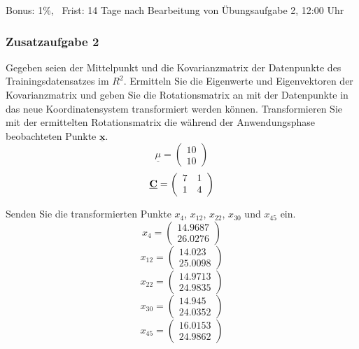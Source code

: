 \documentclass[11pt]{article}
\begin{document}
    Bonus: 1\%,\(\;\;\;\)Frist: 14 Tage nach Bearbeitung von Übungsaufgabe
2, 12:00 Uhr

\subsubsection{Zusatzaufgabe 2}\label{zusatzaufgabe-2}

Gegeben seien der Mittelpunkt und die Kovarianzmatrix der Datenpunkte
des Trainingsdatensatzes im \(R^2\). Ermitteln Sie die Eigenwerte und
Eigenvektoren der Kovarianzmatrix und geben Sie die Rotationsmatrix an
mit der Datenpunkte in das neue Koordinatensystem transformiert werden
können. Transformieren Sie mit der ermittelten Rotationsmatrix die
während der Anwendungsphase beobachteten Punkte
\(\underline{\textbf{x}}\).
\[\underline{\mu} = \left(\begin{array}{c} 10 \\ 10 \end{array}\right)\]
\[\underline{\textbf{C}} = \left(\begin{array}{c c} 7 & 1 \\ 1 & 4 \end{array}\right)\]

Senden Sie die transformierten Punkte \(x_4\), \(x_{12}\), \(x_{22}\),
\(x_{30}\) und \(x_{45}\) ein.
\[x_4 = \left(\begin{array}{c} 14.9687 \\ 26.0276 \end{array}\right)\]
\[x_{12} = \left(\begin{array}{c} 14.023 \\ 25.0098 \end{array}\right)\]
\[x_{22} = \left(\begin{array}{c} 14.9713 \\ 24.9835 \end{array}\right)\]
\[x_{30} = \left(\begin{array}{c} 14.945 \\ 24.0352 \end{array}\right)\]
\[x_{45} = \left(\begin{array}{c} 16.0153 \\ 24.9862 \end{array}\right)\]
\end{document}
